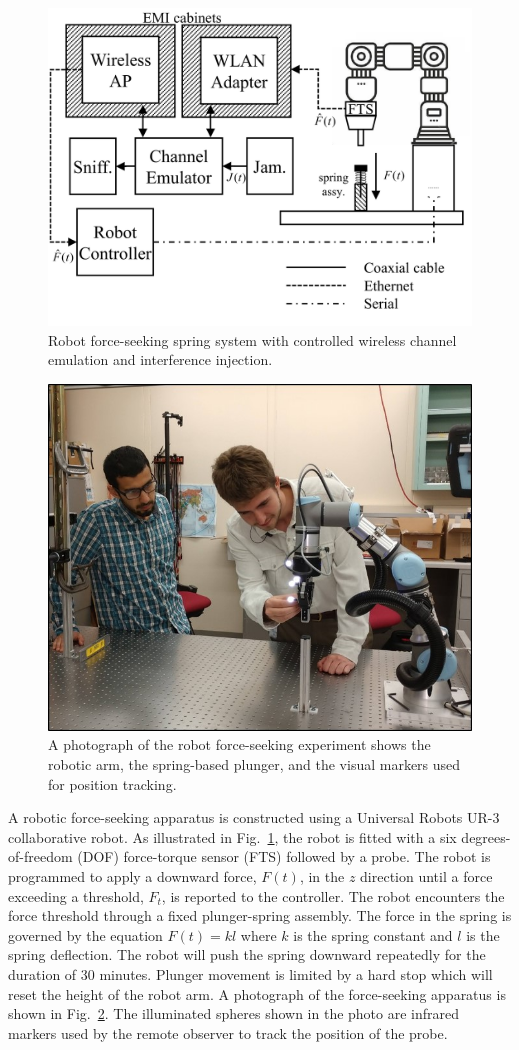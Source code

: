 \begin{figure}[!tbp]
	\centering
	\includegraphics[width=0.65\columnwidth]{./chapter-ftml/diagrams/robotsetup}
	\caption{Robot force-seeking spring system with controlled wireless channel emulation and interference injection.}
	\label{fig:robotsetup}
\end{figure}

\begin{figure}[!tbp]
	\centering
	\includegraphics[width=0.65\columnwidth]{./chapter-ftml/images/PlungerExperiment}
	\caption{A photograph of the robot force-seeking experiment shows the robotic arm, the spring-based plunger, and the visual markers used for position tracking.}
	\label{fig:photo-forceseeker}
\end{figure}	

A robotic force-seeking apparatus is constructed using a Universal Robots UR-3 collaborative robot.  As illustrated in Fig.~\ref{fig:robotsetup}, the robot is fitted with a six degrees-of-freedom (DOF) force-torque sensor (FTS) followed by a probe.  The robot is programmed to apply a downward force, $F(t)$, in the $z$ direction until a force exceeding a threshold, $F_t$, is reported to the controller.  The robot encounters the force threshold through a fixed plunger-spring assembly.  The force in the spring is governed by the equation $F(t)=kl$ where $k$ is the spring constant and $l$ is the spring deflection.  The robot will push the spring downward repeatedly for the duration of 30 minutes.  Plunger movement is limited by a hard stop which will reset the height of the robot arm.  A photograph of the force-seeking apparatus is shown in Fig.~\ref{fig:photo-forceseeker}.  The illuminated spheres shown in the photo are infrared markers used by the remote observer to track the position of the probe.

